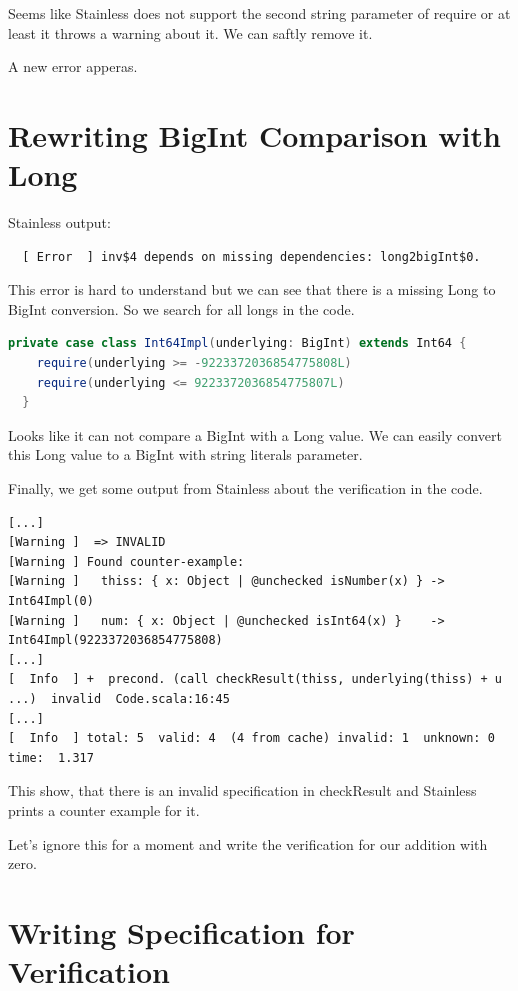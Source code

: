 Seems like Stainless does not support the second string parameter of require or at least it throws a warning about it.
We can saftly remove it.

A new error apperas.


\section{Rewriting BigInt Comparison with Long}

Stainless output:
{\footnotesize\begin{verbatim}
  [ Error  ] inv$4 depends on missing dependencies: long2bigInt$0.
\end{verbatim}}

This error is hard to understand but we can see that there is a missing Long to BigInt conversion.
So we search for all longs in the code.
\begin{lstlisting}[language=scala]
  private case class Int64Impl(underlying: BigInt) extends Int64 {
    require(underlying >= -9223372036854775808L)
    require(underlying <= 9223372036854775807L)
  }
\end{lstlisting}

Looks like it can not compare a BigInt with a Long value.
We can easily convert this Long value to a BigInt with string literals parameter.

Finally, we get some output from Stainless about the verification in the code.
{\footnotesize\begin{verbatim}
[...]
[Warning ]  => INVALID
[Warning ] Found counter-example:
[Warning ]   thiss: { x: Object | @unchecked isNumber(x) } -> Int64Impl(0)
[Warning ]   num: { x: Object | @unchecked isInt64(x) }    -> Int64Impl(9223372036854775808)
[...]
[  Info  ] +  precond. (call checkResult(thiss, underlying(thiss) + u ...)  invalid  Code.scala:16:45
[...]
[  Info  ] total: 5  valid: 4  (4 from cache) invalid: 1  unknown: 0  time:  1.317
\end{verbatim}}

This show, that there is an invalid specification in checkResult and Stainless prints a counter example for it.

Let's ignore this for a moment and write the verification for our addition with zero.


\section{Writing Specification for Verification}

